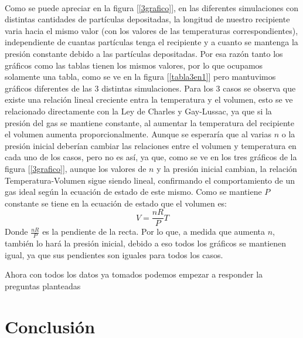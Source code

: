 \documentclass[12pt]{article}
\begin{document}
\\
Como se puede apreciar en la figura [\ref{3grafico}], en las diferentes simulaciones con distintas cantidades de partículas depositadas,  la longitud de nuestro recipiente varia hacia el mismo valor (con los valores de las temperaturas correspondientes), independiente de cuantas partículas tenga el recipiente y a cuanto se mantenga la presión constante debido a las partículas depositadas. Por esa razón tanto los gráficos como las tablas tienen los mismos valores, por lo que ocupamos solamente una tabla, como se ve en la figura [\ref{tabla3en1}] pero mantuvimos gráficos diferentes de las 3 distintas simulaciones. Para los 3 casos se observa que existe una relación lineal creciente entra la temperatura y el volumen, esto se ve relacionado directamente con la Ley de Charles y Gay-Lussac, ya que si la presión del gas se mantiene constante, al aumentar la temperatura del recipiente el volumen aumenta proporcionalmente. Aunque se esperaría que al varias $n$ o la presión inicial deberían cambiar las relaciones entre el volumen y temperatura en cada uno de los casos, pero no es así, ya que, como se ve en los tres gráficos de la figura [\ref{3grafico}], aunque los valores de $n$ y la presión inicial cambian, la relación Temperatura-Volumen sigue siendo lineal, confirmando el comportamiento de un gas ideal según la ecuación de estado de este mismo.  Como se mantiene $P$ constante se tiene en la ecuación de estado que el volumen es: 
\[V=\frac{nR}{P}T\]
Donde $\frac{nR}{P}$ es la pendiente de la recta. Por lo que, a medida que aumenta $n$, también lo hará la presión inicial, debido a eso todos los gráficos se mantienen igual, ya que sus pendientes son iguales para todos los casos.



Ahora con todos los datos ya tomados podemos empezar a responder la preguntas planteadas

\section*{Conclusión}


\newpage
\printbibliography[heading=bibintoc]
\end{document}

